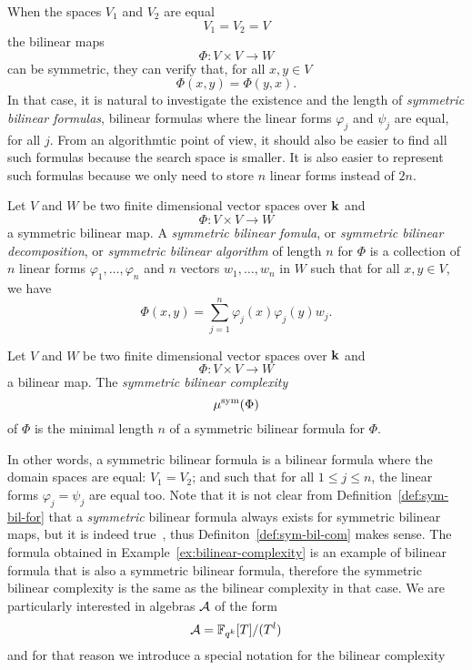 When the spaces $V_1$ and $V_2$ are equal
\[
  V_1 = V_2 = V
\]
the bilinear maps 
\[
  \Phi:V\times V\to W
\]
can be symmetric, \ie they can verify that, for all $x, y\in V$
\[
  \Phi(x, y) = \Phi(y, x).
\]
In that case, it is natural to investigate the existence and the length of
\emph{symmetric bilinear formulas}, \ie bilinear formulas where the linear forms
$\varphi_j$ and $\psi_j$ are equal, for all $j$. From an algorithmtic point of
view, it should also be easier to find all such formulas because the
search space is smaller. It is also easier to represent such formulas because we
only need to store $n$ linear forms instead of $2n$.
\begin{defi}
  \label{def:sym-bil-for}
  Let $V$ and $W$ be two finite dimensional vector spaces over $\mathbf{k}$ and 
  \[
    \Phi:V\times V\to W
  \]
  a symmetric bilinear map. A \emph{symmetric bilinear fomula}, or
  \emph{symmetric bilinear decomposition}, or
  \emph{symmetric bilinear algorithm} of length $n$ for $\Phi$ is a
  collection of $n$ linear forms $\varphi_1, \dots, \varphi_n$
  and $n$ vectors $w_1, \dots, w_n$ in $W$ such that for all
  $x, y\in V$, we have
  \[
    \Phi(x, y) = \sum_{j=1}^n \varphi_j(x)\varphi_j(y)w_j.
  \]
\end{defi}
\begin{defi}
  \label{def:sym-bil-com}
  Let $V$ and $W$ be two finite dimensional vector spaces over $\mathbf{k}$ and 
  \[
    \Phi:V\times V\to W
  \]
  a bilinear map. The \emph{symmetric bilinear complexity} 
  \[
    \mu^{\textrm{sym}}(\Phi)
  \]
  of $\Phi$ is the minimal length $n$ of a symmetric bilinear formula for
  $\Phi$.
\end{defi}
In other words, a symmetric bilinear formula is a bilinear formula where the
domain spaces are equal: $V_1=V_2$; and such that for all $1\leq j\leq n$,
the linear forms $\varphi_j=\psi_j$ are equal too. Note that it is not
clear from Definition~\ref{def:sym-bil-for} that a
\emph{symmetric} bilinear formula always
exists for symmetric bilinear maps, but it is indeed
true~\cite[Lemma $1.6$]{Randriam12}, thus
Definiton~\ref{def:sym-bil-com} makes sense. The formula obtained in
Example~\ref{ex:bilinear-complexity} is an example of bilinear formula that is
also a symmetric bilinear formula, therefore the symmetric bilinear complexity
is the same as the bilinear complexity in that case. We are particularly
interested in algebras $\mathcal{A}$ of the form
\[
  \mathcal{A} = \mathbb{F}_{q^k}[T]/(T^l)
\]
and for that reason we introduce a special notation for the bilinear complexity

